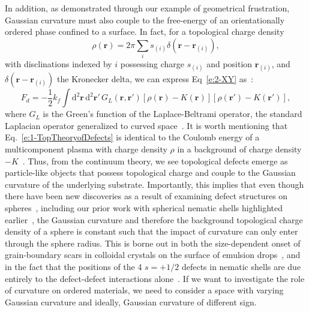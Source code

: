 In addition, as demonstrated through our example of geometrical frustration, Gaussian curvature must also couple to the free-energy of an orientationally ordered phase confined to a surface.
In fact, for a topological charge density
\begin{equation}
  \rho(\mathbf{r}) = 2 \pi \sum\limits_i s_{(i)}\delta(\mathbf{r} - \mathbf{r}_{(i)}),
\end{equation}
with disclinations indexed by $i$ possessing charge $s_{(i)}$ and position $\mathbf{r}_{(i)}$, and $\delta(\mathbf{r} - \mathbf{r}_{(i)})$ the Kronecker delta, we can express Eq~\ref{e:2-XY} as~\cite{RN42,RN175,RN17}:
\begin{equation}
  F_d = -\frac{1}{2} k_f \int \textrm{d}^2\mathbf{r} \, \textrm{d}^2\mathbf{r}' \, G_L(\mathbf{r},\mathbf{r}') [\rho(\mathbf{r})-K(\mathbf{r})] [\rho(\mathbf{r}')-K(\mathbf{r}')],\label{e:1-TopTheoryofDefects}
\end{equation}
where $G_L$ is the Green's function of the Laplace-Beltrami operator, the standard Laplacian operator generalized to curved space~\cite{RN17}.
It is worth mentioning that Eq.~\ref{e:1-TopTheoryofDefects} is identical to the Coulomb energy of a multicomponent plasma with charge density $\rho$ in a background of charge density $-K$~\cite{RN17}.
Thus, from the continuum theory, we see topological defects emerge as particle-like objects that possess topological charge and couple to the Gaussian curvature of the underlying substrate.
Importantly, this implies that even though there have been new discoveries as a result of examining defect structures on spheres~\cite{RN106,RN26,RN110,RN76,RN101,RN165}, including our prior work with spherical nematic shells highlighted earlier~\cite{RN45,RN105}, the Gaussian curvature and therefore the background topological charge density of a sphere is constant such that the impact of curvature can only enter through the sphere radius.
This is borne out in both the size-dependent onset of grain-boundary scars in colloidal crystals on the surface of emulsion drops~\cite{RN26,RN110}, and in the fact that the positions of the 4 $s = +1/2$ defects in nematic shells are due entirely to the defect-defect interactions alone~\cite{RN45}.
If we want to investigate the role of curvature on ordered materials, we need to consider a space with varying Gaussian curvature and ideally, Gaussian curvature of different sign.


